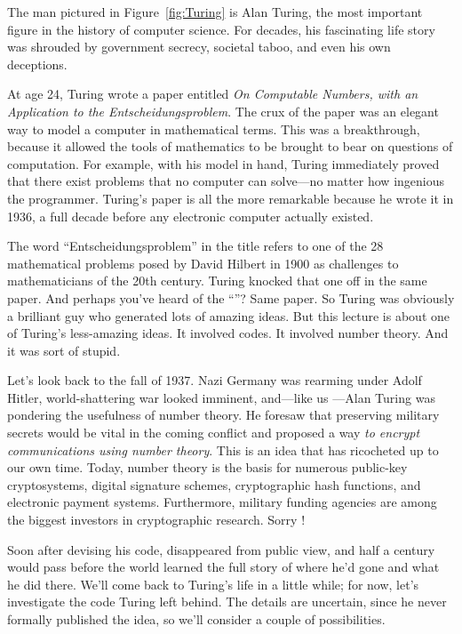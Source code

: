 The man pictured in Figure~\ref{fig:Turing} is Alan Turing, the most
important figure in the history of computer science.  For decades, his
fascinating life story was shrouded by government secrecy, societal
taboo, and even his own deceptions.

At age 24, Turing wrote a paper entitled \emph{On Computable Numbers,
  with an Application to the Entscheidungsproblem}.  The crux of the
paper was an elegant way to model a computer in mathematical terms.
This was a breakthrough, because it allowed the tools of mathematics
to be brought to bear on questions of computation.  For example, with
his model in hand, Turing immediately proved that there exist problems
that no computer can solve---no matter how ingenious the programmer.
Turing's paper is all the more remarkable because he wrote it in 1936,
a full decade before any electronic computer actually existed.

The word ``Entscheidungsproblem'' in the title refers to one of the 28
mathematical problems posed by David Hilbert in 1900 as challenges to
mathematicians of the 20th century.  Turing knocked that one off in
the same paper.  And perhaps you've heard of the ``''?  Same paper.  So Turing was obviously a brilliant guy who
generated lots of amazing ideas.  But this lecture is about one of
Turing's less-amazing ideas.  It involved codes.  It involved number
theory.  And it was sort of stupid.


Let's look back to the fall of 1937.  Nazi Germany was rearming under
Adolf Hitler, world-shattering war looked imminent, and---like us
---Alan Turing was pondering the usefulness of number theory.  He
foresaw that preserving military secrets would be vital in the coming
conflict and proposed a way \emph{to encrypt communications using
  number theory}.  This is an idea that has ricocheted up to our own
time.  Today, number theory is the basis for numerous public-key
cryptosystems, digital signature schemes, cryptographic hash
functions, and electronic payment systems.  Furthermore, military
funding agencies are among the biggest investors in cryptographic
research.  Sorry !

Soon after devising his code,  disappeared from public
view, and half a century would pass before the world learned the full
story of where he'd gone and what he did there.  We'll come back to
Turing's life in a little while; for now, let's investigate the code
Turing left behind.  The details are uncertain, since he never
formally published the idea, so we'll consider a couple of
possibilities.

